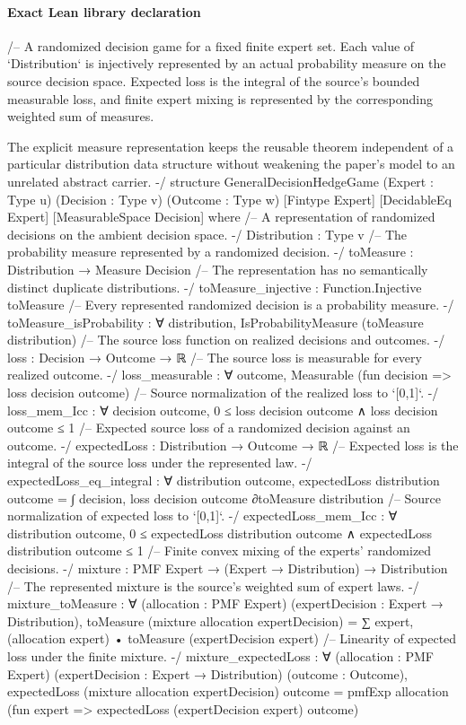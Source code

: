 \documentclass[10pt]{article}
\begin{document}
\paragraph{Exact Lean library declaration}
\begin{ReviewVerbatim}
/--
A randomized decision game for a fixed finite expert set. Each value of
`Distribution` is injectively represented by an actual probability measure on
the source decision space. Expected loss is the integral of the source's
bounded measurable loss, and finite expert mixing is represented by the
corresponding weighted sum of measures.

The explicit measure representation keeps the reusable theorem independent of
a particular distribution data structure without weakening the paper's model
to an unrelated abstract carrier.
-/
structure GeneralDecisionHedgeGame (Expert : Type u) (Decision : Type v) (Outcome : Type w)
    [Fintype Expert] [DecidableEq Expert] [MeasurableSpace Decision] where
  /-- A representation of randomized decisions on the ambient decision space. -/
  Distribution : Type v
  /-- The probability measure represented by a randomized decision. -/
  toMeasure : Distribution → Measure Decision
  /-- The representation has no semantically distinct duplicate distributions. -/
  toMeasure_injective : Function.Injective toMeasure
  /-- Every represented randomized decision is a probability measure. -/
  toMeasure_isProbability : ∀ distribution, IsProbabilityMeasure (toMeasure distribution)
  /-- The source loss function on realized decisions and outcomes. -/
  loss : Decision → Outcome → ℝ
  /-- The source loss is measurable for every realized outcome. -/
  loss_measurable : ∀ outcome, Measurable (fun decision => loss decision outcome)
  /-- Source normalization of the realized loss to `[0,1]`. -/
  loss_mem_Icc : ∀ decision outcome,
    0 ≤ loss decision outcome ∧ loss decision outcome ≤ 1
  /-- Expected source loss of a randomized decision against an outcome. -/
  expectedLoss : Distribution → Outcome → ℝ
  /-- Expected loss is the integral of the source loss under the represented law. -/
  expectedLoss_eq_integral : ∀ distribution outcome,
    expectedLoss distribution outcome =
      ∫ decision, loss decision outcome ∂toMeasure distribution
  /-- Source normalization of expected loss to `[0,1]`. -/
  expectedLoss_mem_Icc : ∀ distribution outcome,
    0 ≤ expectedLoss distribution outcome ∧ expectedLoss distribution outcome ≤ 1
  /-- Finite convex mixing of the experts' randomized decisions. -/
  mixture : PMF Expert → (Expert → Distribution) → Distribution
  /-- The represented mixture is the source's weighted sum of expert laws. -/
  mixture_toMeasure : ∀ (allocation : PMF Expert) (expertDecision : Expert → Distribution),
    toMeasure (mixture allocation expertDecision) =
      ∑ expert, (allocation expert) • toMeasure (expertDecision expert)
  /-- Linearity of expected loss under the finite mixture. -/
  mixture_expectedLoss : ∀ (allocation : PMF Expert) (expertDecision : Expert → Distribution)
    (outcome : Outcome),
      expectedLoss (mixture allocation expertDecision) outcome =
        pmfExp allocation (fun expert => expectedLoss (expertDecision expert) outcome)
\end{ReviewVerbatim}
\end{document}
